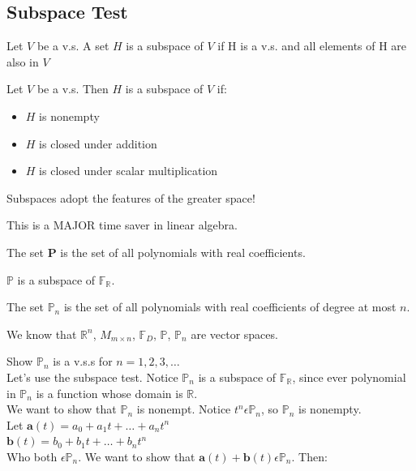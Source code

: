 \documentclass{report}
\begin{document}
\subsection*{Subspace Test}
\begin{definition}
	Let $V$ be a v.s. A set $H$ is a subspace of $V$ if H is a v.s. and all elements of H are also in $V$
\end{definition}
\begin{theorem}
	Let $V$ be a v.s. Then $H$ is a subspace of $V$ if:
	\begin{itemize}
		\item $H$ is nonempty
		\item $H$ is closed under addition
		\item $H$ is closed under scalar multiplication
	\end{itemize}
\end{theorem}
Subspaces adopt the features of the greater space!
\begin{remark}
	This is a MAJOR time saver in linear algebra.
\end{remark}
\begin{definition}
	The set $\mathbf{P}$ is the set of all polynomials with real coefficients.
\end{definition}
\begin{theorem}
	$\mathbb{P}$ is a subspace of $\mathbb{F}_{\mathbb{R}}$.
\end{theorem}
\begin{definition}
	The set $\mathbb{P}_n$ is the set of all polynomials with real coefficients of degree at most $n$.
\end{definition}
We know that $\mathbb{R}^n$, $M_{m\times n}$, $\mathbb{F}_D$, $\mathbb{P}$, $\mathbb{P}_n$ are vector spaces.
\begin{example}
	Show $\mathbb{P}_n$ is a v.s.s for $n=1,2,3,\ldots$\\
	Let's use the subspace test. Notice $\mathbb{P}_n$ is a subspace of $\mathbb{F}_\mathbb{R}$, since ever polynomial in $\mathbb{P}_n$ is a function whose domain is $\mathbb{R}$.\\
	We want to show that $\mathbb{P}_n$ is nonempt. Notice $t^n \epsilon \mathbb{P}_n$, so $\mathbb{P}_n$ is nonempty.\\
	Let $\mathbf{a}(t)=a_0+a_1t+\ldots+a_nt^n$\\
	$\mathbf{b}(t)=b_0+b_1t+\ldots+b_nt^n$\\
	Who both $\epsilon \mathbb{P}_n$. We want to show that $\mathbf{a}(t)+\mathbf{b}(t)\epsilon \mathbb{P}_n$. Then:\\
\end{example}
\end{document}
